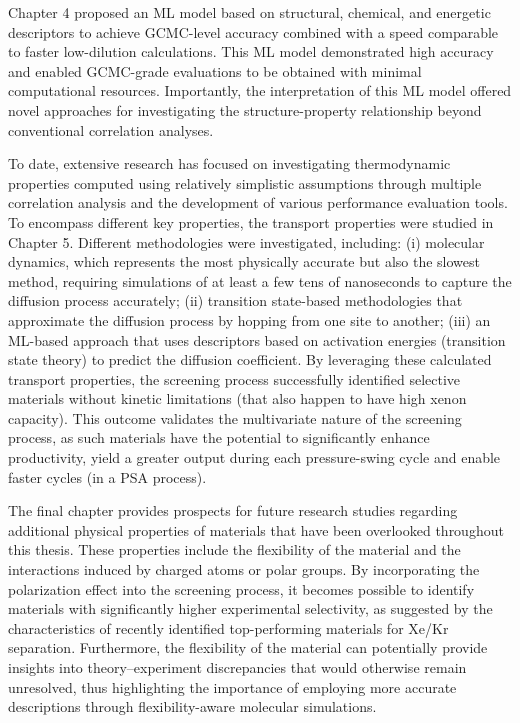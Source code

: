 Chapter 4 proposed an ML model based on structural, chemical, and energetic descriptors to achieve GCMC-level accuracy combined with a speed comparable to faster low-dilution calculations.\autocite{Ren_2023_ml} This ML model demonstrated high accuracy and enabled GCMC-grade evaluations to be obtained with minimal computational resources. Importantly, the interpretation of this ML model offered novel approaches for investigating the structure-property relationship beyond conventional correlation analyses.

To date, extensive research has focused on investigating thermodynamic properties computed using relatively simplistic assumptions through multiple correlation analysis and the development of various performance evaluation tools. To encompass different key properties, the transport properties were studied in Chapter 5. Different methodologies were investigated, including: (i) molecular dynamics, which represents the most physically accurate but also the slowest method, requiring simulations of at least a few tens of nanoseconds to capture the diffusion process accurately; (ii) transition state-based methodologies that approximate the diffusion process by hopping from one site to another; (iii) an ML-based approach that uses descriptors based on activation energies (transition state theory) to predict the diffusion coefficient. By leveraging these calculated transport properties, the screening process successfully identified selective materials without kinetic limitations (that also happen to have high xenon capacity). This outcome validates the multivariate nature of the screening process, as such materials have the potential to significantly enhance productivity, yield a greater output during each pressure-swing cycle and enable faster cycles (in a PSA process). 

The final chapter provides prospects for future research studies regarding additional physical properties of materials that have been overlooked throughout this thesis. These properties include the flexibility of the material and the interactions induced by charged atoms or polar groups. By incorporating the polarization effect into the screening process, it becomes possible to identify materials with significantly higher experimental selectivity, as suggested by the characteristics of recently identified top-performing materials for Xe/Kr separation.\autocite{Li_2019,Pei_2022} Furthermore, the flexibility of the material can potentially provide insights into theory--experiment discrepancies that would otherwise remain unresolved, thus highlighting the importance of employing more accurate descriptions through flexibility-aware molecular simulations.

